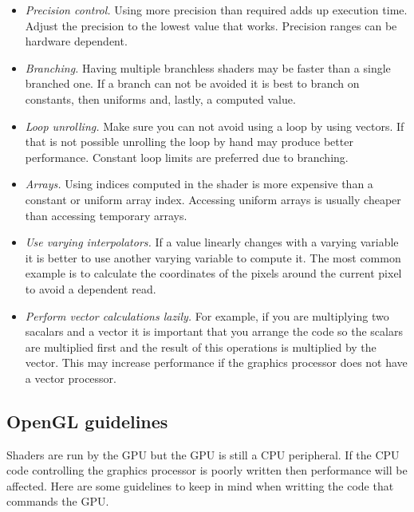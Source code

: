 \documentclass[conference]{IEEEtran}
\begin{document}
\begin{itemize}
\item \emph{Precision control.} Using more precision than required adds up execution time. Adjust the precision to the lowest value that works. Precision ranges can be hardware dependent.
\item \emph{Branching.} Having multiple branchless shaders may be faster than a single branched one. If a branch can not be avoided it is best to branch on constants, then uniforms and, lastly, a computed value.
\item \emph{Loop unrolling.} Make sure you can not avoid using a loop by using vectors. If that is not possible unrolling the loop by hand may produce better performance. Constant loop limits are preferred due to branching.
\item \emph{Arrays.} Using indices computed in the shader is more expensive than a constant or uniform array index. Accessing uniform arrays is usually cheaper than accessing temporary arrays.
\item \emph{Use varying interpolators.} If a value linearly changes with a varying variable it is better to use another varying variable to compute it. The most common example is to calculate the coordinates of the pixels around the current pixel to avoid a dependent read.
\item \emph{Perform vector calculations lazily.} For example, if you are multiplying two sacalars and a vector it is important that you arrange the code so the scalars are multiplied first and the result of this operations is multiplied by the vector. This may increase performance if the graphics processor does not have a vector processor.
\end{itemize}

	\subsection{OpenGL guidelines}
Shaders are run by the GPU but the GPU is still a CPU peripheral. If the CPU code controlling the graphics processor is poorly written then performance will be affected. Here are some guidelines to keep in mind when writting the code that commands the GPU.
\end{document}
